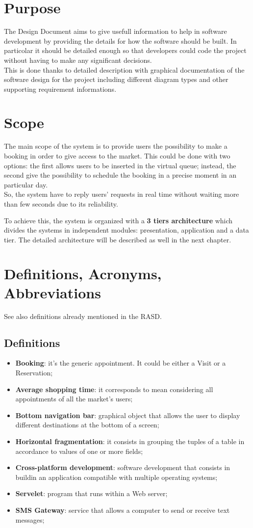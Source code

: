 \section{Purpose}
The Design Document aims to give usefull information to help in software development by providing the details for how the software should be built. In particolar it should be detailed enough so that developers could code the project without having to make any significant decisions. \\
This is done thanks to detailed description with graphical documentation of the software design for the project including different diagram types and other supporting requirement informations.
\section{Scope}
The main scope of the system is to provide users the possibility to make a booking in order to give access to the market. This could be done with two options: the first allows users to be inserted in the virtual queue; instead, the second give the possibility to schedule the booking in a precise moment in an particular day. \\
So, the system have to reply users' requests in real time without waiting more than few seconds due to its reliability. \par
To achieve this, the system is organized with a \textbf{3 tiers architecture} which divides the systems in independent modules: presentation, application and a data tier. The detailed architecture will be described as well in the next chapter.

\bigskip
\bigskip
\section{Definitions, Acronyms, Abbreviations}
See also definitions already mentioned in the RASD.
\subsection{Definitions}
\begin{itemize}

\item \textbf{Booking}: it's the generic appointment. It could be either a Visit or a Reservation;
\item \textbf{Average shopping time}: it corresponds to mean considering all appointments of all the market's users; 
\item \textbf{Bottom navigation bar}: graphical object that allows the user to display different destinations at the bottom of a screen;
\item \textbf{Horizontal fragmentation}: it consists in grouping the tuples of a table in accordance to values of one or more fields;
\item \textbf{Cross-platform development}: software development that consists in buildin an application compatible with multiple operating systems;
\item \textbf{Servelet}: program that runs within a Web server;
\item \textbf{SMS Gateway}: service that allows a computer to send or receive text messages; 
\end{itemize}

